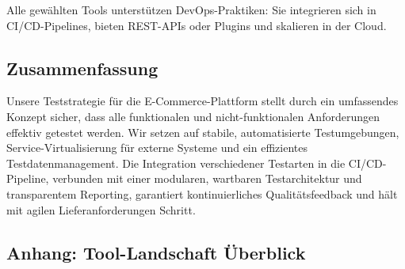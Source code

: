 Alle gewählten Tools unterstützen DevOps-Praktiken: Sie integrieren sich in CI/CD-Pipelines,
bieten REST-APIs oder Plugins und skalieren in der Cloud.

\subsection{Zusammenfassung}
Unsere Teststrategie für die E-Commerce-Plattform stellt durch ein umfassendes Konzept sicher,
dass alle funktionalen und nicht-funktionalen Anforderungen effektiv getestet werden.
Wir setzen auf stabile, automatisierte Testumgebungen, Service-Virtualisierung für externe Systeme
und ein effizientes Testdatenmanagement. Die Integration verschiedener Testarten in die
CI/CD-Pipeline, verbunden mit einer modularen, wartbaren Testarchitektur und transparentem
Reporting, garantiert kontinuierliches Qualitätsfeedback und hält mit agilen Lieferanforderungen
Schritt.

\subsection{Anhang: Tool-Landschaft Überblick}

